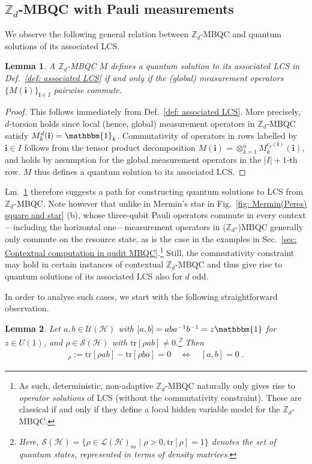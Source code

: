 \documentclass[aps,pra,letterpaper,onrcolumn,nofootinbib,notitlepage,longbibliography]{revtex4-1}
\newtheorem{lemma}{Lemma}
\newcommand{\tr}{\mathrm{tr}}
\newcommand{\one}{\mathbbm{1}}
\newcommand{\UH}{\mc{U}(\cH)}
\newcommand{\SH}{\mc{S}(\cH)}
\newcommand{\LH}{\mc{L}(\cH)}
\newcommand{\LHsa}{{\LH_\mathrm{sa}}}
\newcommand{\zz}{\mathbb Z}
\newcommand{\bi}{\mathbf{i}}
\newcommand\mc[1]{\mathcal{#1}}
\newcommand{\cH}{\mc{H}}
\begin{document}
\subsection{$\zz_d$-MBQC with Pauli measurements}\label{sec: MBQC as quantum solutions to LCS for Pauli observables}

We observe the following general relation between $\zz_d$-MBQC and quantum solutions of its associated LCS.


\begin{lemma}\label{lm: MBQC + comm = LCS}
    A $\zz_d$-MBQC $M$ defines a quantum solution to its associated LCS in Def.~\ref{def: associated LCS} if and only if the (global) measurement operators $\{M(\bi)\}_{\bi\in I}$ pairwise commute.
\end{lemma}

\begin{proof}
    This follows immediately from Def.~\ref{def: associated LCS}. More precisely, $d$-torsion holds since local (hence, global) measurement operators in $\zz_d$-MBQC satisfy $M^d_k(\bi)=\one_k$. Commutativity of operators in rows labelled by $\bi\in I$ follows from the tensor product decomposition $M(\bi)=\otimes_{k=1}^n M^{c_k(\bi)}_k(\bi)$, and holds by assumption for the global measurement operators in the $|I|+1$-th row. $M$ thus defines a quantum solution to its associated LCS.
\end{proof}


Lm.~\ref{lm: MBQC + comm = LCS} therefore suggests a path for constructing quantum solutions to LCS from $\zz_d$-MBQC. Note however that unlike in Mermin's star in Fig.~\ref{fig: Mermin(Peres) square and star} (b), whose three-qubit Pauli operators commute in every context---including the horizontal one---measurement operators in ($\zz_d$-)MBQC generally only commute on the resource state, as is the case in the examples in Sec.~\ref{sec: Contextual computation in qudit MBQC}.\footnote{As such, deterministic, non-adaptive $\zz_d$-MBQC naturally only gives rise to \emph{operator solutions} of LCS (without the commutativity constraint). These are classical if and only if they define a local hidden variable model for the $\zz_d$-MBQC.} Still, the commutativity constraint may hold in certain instances of contextual $\zz_d$-MBQC and thus give rise to quantum solutions of its associated LCS also for $d$ odd.

In order to analyse such cases, we start with the following straightforward observation.

\begin{lemma}\label{lm: commutativity up to phase is state-independent}
    Let $a,b\in\UH$ with $[a,b]=aba^{-1}b^{-1}=z\one$ for $z\in U(1)$, and $\rho\in\SH$ with $\tr[\rho ab]\neq 0$.\footnote{Here, $\SH=\{\rho\in\LHsa\mid\rho>0,\tr[\rho]=1\}$ denotes the set of quantum states, represented in terms of density matrices.} Then
    \begin{align}
        [a,b]_\rho
        :=\tr[\rho ab]-\tr[\rho ba]=0 \quad \Longleftrightarrow \quad [a,b]=0\; .
    \end{align}
\end{lemma}
\end{document}
